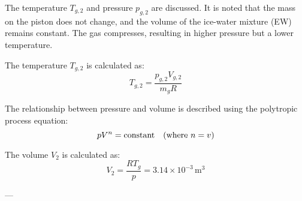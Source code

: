 The temperature \( T_{g,2} \) and pressure \( p_{g,2} \) are discussed. It is noted that the mass on the piston does not change, and the volume of the ice-water mixture (EW) remains constant. The gas compresses, resulting in higher pressure but a lower temperature.  

The temperature \( T_{g,2} \) is calculated as:  
\[
T_{g,2} = \frac{p_{g,2} V_{g,2}}{m_g R}
\]  

The relationship between pressure and volume is described using the polytropic process equation:  
\[
p V^n = \text{constant} \quad \text{(where \( n = v \))}
\]  

The volume \( V_2 \) is calculated as:  
\[
V_2 = \frac{RT_g}{p} = 3.14 \times 10^{-3} \, \text{m}^3
\]  

---